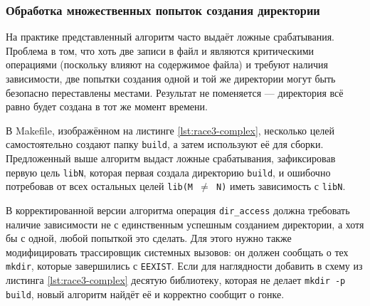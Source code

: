 \subsubsection{Обработка множественных попыток создания директории}

На практике представленный алгоритм часто выдаёт ложные срабатывания. Проблема в том, что хоть две записи в файл и являются критическими операциями (поскольку влияют на содержимое файла) и требуют наличия зависимости, две попытки создания одной и той же директории могут быть безопасно переставлены местами. Результат не поменяется --- директория всё равно будет создана в тот же момент времени.



В Makefile, изображённом на листинге \ref{lst:race3-complex}, несколько целей самостоятельно создают папку \texttt{build}, а затем используют её для сборки. Предложенный выше алгоритм выдаст ложные срабатывания, зафиксировав первую цель \texttt{libN}, которая первая создала директорию \texttt{build}, и ошибочно потребовав от всех остальных целей \texttt{lib(M $\ne$ N)} иметь зависимость с \texttt{libN}.

В корректированной версии алгоритма операция \texttt{dir\_access} должна требовать наличие зависимости не с единственным успешным созданием директории, а хотя бы с одной, любой попыткой это сделать. Для этого нужно также модифицировать трассировщик системных вызовов: он должен сообщать о тех \texttt{mkdir}, которые завершились с \texttt{EEXIST}. Если для наглядности добавить в схему из листинга \ref{lst:race3-complex} десятую библиотеку, которая не делает \texttt{mkdir -p build}, новый алгоритм найдёт её и корректно сообщит о гонке.

